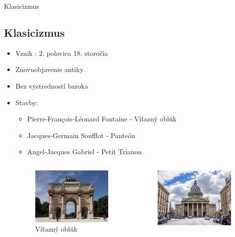\documentclass[dvipsnames]{beamer}
\begin{document}
\begin{frame}{Klasicizmus}
	\subsection{Klasicizmus}
	\begin{itemize}
		\item Vznik : 2. polovica 18. storočia
		\item Znovuobjavenie antiky
		\item Bez výstredností baroka
		\item Stavby:
		      \begin{itemize}
			      \item \textcolor{BurntOrange}{Pierre-François-Léonard Fontaine} - Víťazný oblúk
			      \item \textcolor{BurntOrange}{Jacques-Germain Soufflot} - Panteón
			      \item \textcolor{BurntOrange}{Angel-Jacques Gabriel} - Petit Trianon
		      \end{itemize}
		      \begin{columns}
			      \kern0pt
			      \begin{figure}
				      \includegraphics[scale=0.3]{ark}
				      \caption{Víťazný oblúk}
			      \end{figure}
			      \begin{figure}
				      \includegraphics[scale=0.3]{panty}

\end{figure}
\end{columns}
\end{itemize}
\end{frame}
\end{document}
